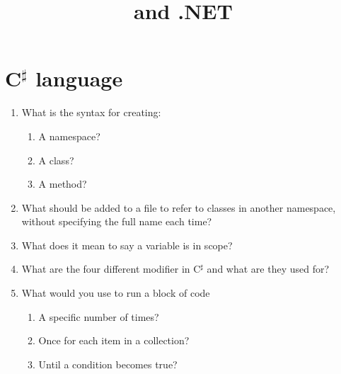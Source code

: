\documentclass{article}
\title{\csharp and .NET}
\date{}
\newcommand{\csharp}{C$^\sharp$ }
\begin{document}
\maketitle

\section{\csharp language}
\begin{enumerate}
  \item What is the syntax for creating:
    \begin{enumerate}
      \item A namespace?
      \item A class?
      \item A method?
    \end{enumerate}
  \item What should be added to a file to refer to classes in another namespace, without specifying the full name each time?

  \item What does it mean to say a variable is in scope?
  
  \item What are the four different modifier in \csharp and what are they used for?
  
  \item What would you use to run a block of code
  \begin{enumerate}
    \item A specific number of times?
    \item Once for each item in a collection?
    \item Until a condition becomes true?
  \end{enumerate}
  
\end{enumerate}
\end{document}
